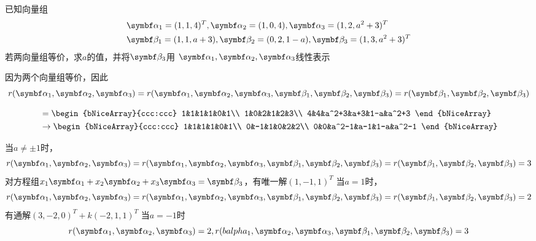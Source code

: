 \documentclass{article}
\begin{document}
\begin{examplle}[]
已知向量组
\begin{align*}
&\balpha_1=(1,1,4)^T,\balpha_2=(1,0,4),\balpha_3=(1,2,a^2+3)^T\\
&\bbeta_1=(1,1,a+3),\bbeta_2=(0,2,1-a),\bbeta_3=(1,3,a^2+3)^T
\end{align*}
若两向量组等价，求\(a\)的值，并将\(\bbeta_3\)用
\(\balpha_1,\balpha_2,\balpha_3\)线性表示

因为两个向量组等价，因此 
\begin{equation*}
r(\balpha_1,\balpha_2,\balpha_3)=r(\balpha_1,\balpha_2,\balpha_3,
\bbeta_1,\bbeta_2,\bbeta_3)=r(\bbeta_1,\bbeta_2,\bbeta_3)
\end{equation*}

\begin{align*}
[\balpha_1,\balpha_2,\balpha_3\mid\bbeta_1,\bbeta_2,\bbeta_3]&=
\begin{bNiceArray}{ccc:ccc}
1&1&1&1&0&1\\
1&0&2&1&2&3\\
4&4&a^2+3&a+3&1-a&a^2+3
\end{bNiceArray}\\
&\to\begin{bNiceArray}{ccc:ccc}
1&1&1&1&0&1\\
0&-1&1&0&2&2\\
0&0&a^2-1&a-1&1-a&a^2-1
\end{bNiceArray}
 \end{align*}

当\(a\neq\pm1\)时，
 \begin{equation*}
 r(\balpha_1,\balpha_2,\balpha_3)=r(\balpha_1,\balpha_2,\balpha_3,
\bbeta_1,\bbeta_2,\bbeta_3)=r(\bbeta_1,\bbeta_2,\bbeta_3)=3
 \end{equation*}
对方程组\(x_1\balpha_1+x_2\balpha_2+x_3\balpha_3=\bbeta_3\)，有唯一解\((1,-1,1)^T\)
当\(a=1\)时，
 \begin{equation*}
 r(\balpha_1,\balpha_2,\balpha_3)=r(\balpha_1,\balpha_2,\balpha_3,
\bbeta_1,\bbeta_2,\bbeta_3)=r(\bbeta_1,\bbeta_2,\bbeta_3)=2
 \end{equation*}
有通解\((3,-2,0)^T+k(-2,1,1)^T\)
当\(a=-1\)时
\begin{equation*}
r(\balpha_1,\balpha_2,\balpha_3)=2,
r(balpha_1,\balpha_2,\balpha_3,\bbeta_1,\bbeta_2,\bbeta_3)=3
\end{equation*}
\end{examplle}
\end{document}

